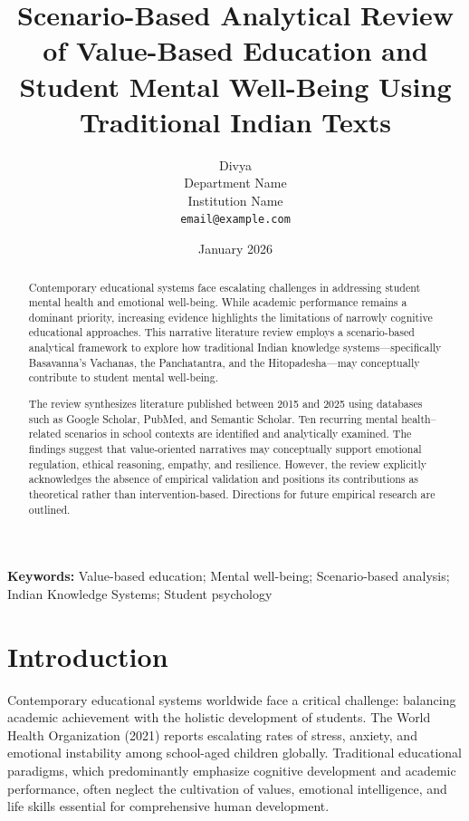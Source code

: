 \documentclass[12pt,a4paper,twocolumn]{article}
\title{\textbf{Scenario-Based Analytical Review of Value-Based Education and Student Mental Well-Being Using Traditional Indian Texts}}
\author{
Divya \\
\small Department Name \\
\small Institution Name \\
\small \texttt{email@example.com}
}
\date{January 2026}
\begin{document}
\onecolumn
\maketitle

\vspace{-0.2cm}

\begin{abstract}
\noindent Contemporary educational systems face escalating challenges in addressing student mental health and emotional well-being. While academic performance remains a dominant priority, increasing evidence highlights the limitations of narrowly cognitive educational approaches. This narrative literature review employs a scenario-based analytical framework to explore how traditional Indian knowledge systems—specifically Basavanna's Vachanas, the Panchatantra, and the Hitopadesha—may conceptually contribute to student mental well-being.

The review synthesizes literature published between 2015 and 2025 using databases such as Google Scholar, PubMed, and Semantic Scholar. Ten recurring mental health–related scenarios in school contexts are identified and analytically examined. The findings suggest that value-oriented narratives may conceptually support emotional regulation, ethical reasoning, empathy, and resilience. However, the review explicitly acknowledges the absence of empirical validation and positions its contributions as theoretical rather than intervention-based. Directions for future empirical research are outlined.
\end{abstract}

\vspace{0.1cm}

\noindent\textbf{Keywords:} Value-based education; Mental well-being; Scenario-based analysis; Indian Knowledge Systems; Student psychology

\newpage

\twocolumn

\section{Introduction}

Contemporary educational systems worldwide face a critical challenge: balancing academic achievement with the holistic development of students. The World Health Organization (2021) reports escalating rates of stress, anxiety, and emotional instability among school-aged children globally. Traditional educational paradigms, which predominantly emphasize cognitive development and academic performance, often neglect the cultivation of values, emotional intelligence, and life skills essential for comprehensive human development.
\end{document}
